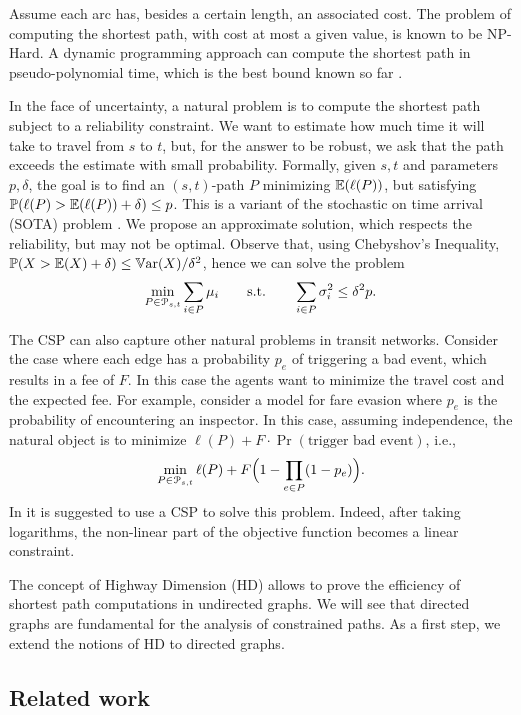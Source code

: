 
Assume each arc has, besides a certain length, an associated cost. 
The problem of computing the shortest path, with cost at most a given value, is known to be NP-Hard.
A dynamic programming approach can compute the shortest path in pseudo-polynomial time, which is the best bound known so far .

In the face of uncertainty, a natural problem is to compute the shortest path subject to a reliability constraint.
We want to estimate how much time it will take to travel from $s$ to $t$, but, for the answer to be robust, we ask that the path exceeds the estimate with small probability.
Formally, given $s,t$ and parameters $p,\delta$, the goal is to find an $(s,t)$-path $P$ minimizing $\mathbb{E}(\ell(P))$, but satisfying $\mathbb{P}(\ell(P)>\mathbb{E}(\ell(P))+\delta)\leq p$.
This is a variant of the stochastic on time arrival (SOTA) problem \cite{fan2005arriving}.
We propose an approximate solution, which respects the reliability, but may not be optimal.
Observe that, using Chebyshov's Inequality, $\mathbb{P}(X>\mathbb{E}(X)+\delta)\leq \mathbb{V}\textnormal{ar}(X)/\delta^2$, hence we can solve
the problem 
\[
\min_{ P\in\mathcal{P}_{s,t}}\sum_{i\in P}\mu_i \qquad \text{s.t.}\qquad \sum_{i\in P}\sigma^2_i\leq \delta^2p.
\]


The CSP can also capture other natural problems in transit networks.
Consider the case where each edge has a probability $p_e$ of triggering a bad event, which results in a fee of $F$.
In this case the agents want to minimize the travel cost and the expected fee.
For example, \citet{fareevasion} consider a model for fare evasion where $p_e$ is the probability of encountering an inspector.
In this case, assuming independence, the natural object is to minimize $\ell(P)+F\cdot\Pr(\text{trigger bad event})$, i.e.,
\[
\min_{P\in\mathcal{P}_{s,t}} \ell(P)+F\Bigl(1-\prod_{e\in P}(1-p_e)\Bigr).
\]
In \citep{fareevasion} it is suggested to use a CSP to solve this problem.
Indeed, after taking logarithms, the non-linear part of the objective function becomes a linear constraint.

The concept of Highway Dimension (HD) \cite{highway2010,highway2013} allows to prove the efficiency of shortest path computations in undirected graphs.
We will see that directed graphs are fundamental for the analysis of constrained paths.
As a first step, we extend the notions of HD to directed graphs.

\subsection{Related work}

